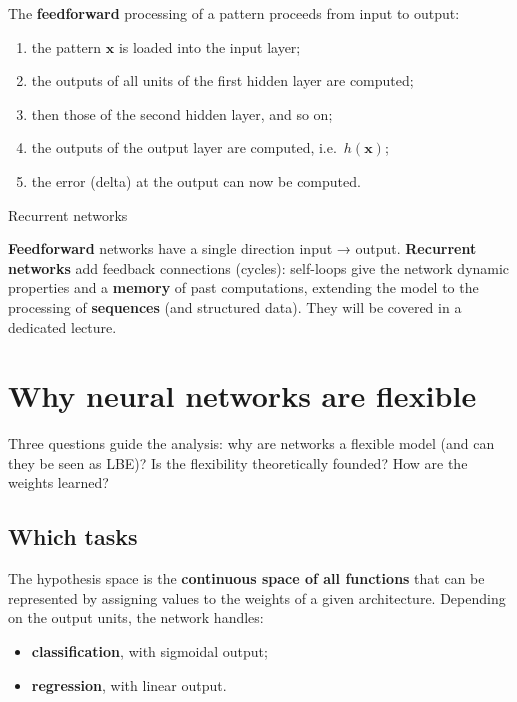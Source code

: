 The \textbf{feedforward} processing of a pattern proceeds from input to
output:

\begin{enumerate}
\def\labelenumi{\arabic{enumi}.}
\tightlist
\item
  the pattern \(\mathbf{x}\) is loaded into the input layer;
\item
  the outputs of all units of the first hidden layer are computed;
\item
  then those of the second hidden layer, and so on;
\item
  the outputs of the output layer are computed, i.e.\
  \(h(\mathbf{x})\);
\item
  the error (delta) at the output can now be computed.
\end{enumerate}

\begin{boxnote}{Recurrent networks}

\textbf{Feedforward} networks have a single direction input → output.
\textbf{Recurrent networks} add feedback connections (cycles):
self-loops give the network dynamic properties and a \textbf{memory}
of past computations, extending the model to the processing of
\textbf{sequences} (and structured data). They will be covered in a
dedicated lecture.

\end{boxnote}

\section{Why neural networks are
flexible}\label{perchuxe9-le-reti-neurali-sono-flessibili}

Three questions guide the analysis: why are networks a flexible model
(and can they be seen as LBE)? Is the flexibility theoretically
founded? How are the weights learned?

\subsection{Which tasks}\label{quali-task}

The hypothesis space is the \textbf{continuous space of all functions}
that can be represented by assigning values to the weights of a given
architecture. Depending on the output units, the network handles:

\begin{itemize}
\tightlist
\item
  \textbf{classification}, with sigmoidal output;
\item
  \textbf{regression}, with linear output.
\end{itemize}

